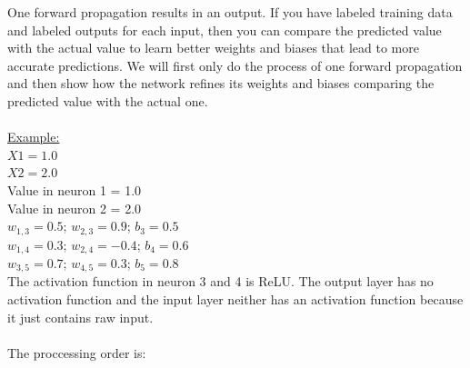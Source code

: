 \documentclass[a4paper,12pt]{report}
\begin{document}
	
	
One forward propagation results in an output. If you have labeled training data and labeled outputs for each input, then you can compare the predicted value with the actual value to learn better weights and biases that lead to more accurate predictions. We will first only do the process of one forward propagation and then show how the network refines its weights and biases comparing the predicted value with the actual one.\\\\

	
\noindent\underline{Example:}\\

\noindent
$X1 = 1.0$ \\
$X2 = 2.0$ \\
Value in neuron 1 = 1.0 \\
Value in neuron 2 = 2.0 \\
$w_{1,3} = 0.5$; $w_{2,3} = 0.9$; $b_3 = 0.5$ \\
$w_{1,4} = 0.3$; $w_{2,4} = -0.4$; $b_4 = 0.6$ \\
$w_{3,5} = 0.7$; $w_{4,5} = 0.3$; $b_5 = 0.8$ \\[1em]
\noindent
The activation function in neuron 3 and 4 is ReLU. The output layer has no activation function and the input layer neither has an activation function because it just contains raw input.\\\\
The proccessing order is:
\end{document}
